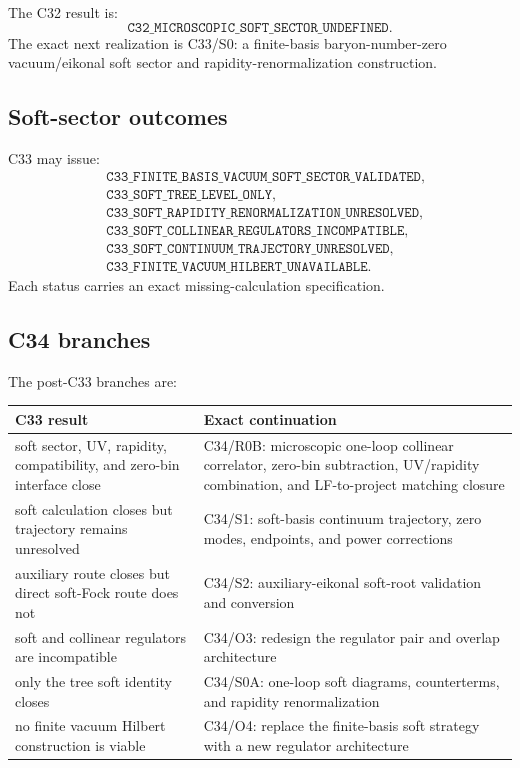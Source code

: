 \documentclass[11pt]{article}
\begin{document}
The C32 result is:
\begin{equation}
 \texttt{C32\_MICROSCOPIC\_SOFT\_SECTOR\_UNDEFINED}.
 \label{eq:current-branch}
\end{equation}
The exact next realization is C33/S0: a finite-basis baryon-number-zero vacuum/eikonal soft sector and rapidity-renormalization construction.

\subsection{Soft-sector outcomes}

C33 may issue:
\begin{align}
 &\texttt{C33\_FINITE\_BASIS\_VACUUM\_SOFT\_SECTOR\_VALIDATED},\\
 &\texttt{C33\_SOFT\_TREE\_LEVEL\_ONLY},\\
 &\texttt{C33\_SOFT\_RAPIDITY\_RENORMALIZATION\_UNRESOLVED},\\
 &\texttt{C33\_SOFT\_COLLINEAR\_REGULATORS\_INCOMPATIBLE},\\
 &\texttt{C33\_SOFT\_CONTINUUM\_TRAJECTORY\_UNRESOLVED},\\
 &\texttt{C33\_FINITE\_VACUUM\_HILBERT\_UNAVAILABLE}.
 \label{eq:c33-statuses}
\end{align}
Each status carries an exact missing-calculation specification.

\subsection{C34 branches}

The post-C33 branches are:
\begin{longtable}{L{0.33\textwidth}L{0.58\textwidth}}
\toprule
C33 result & Exact continuation\\
\midrule
\endhead
soft sector, UV, rapidity, compatibility, and zero-bin interface close &
C34/R0B: microscopic one-loop collinear correlator, zero-bin subtraction, UV/rapidity combination, and LF-to-project matching closure\\
soft calculation closes but trajectory remains unresolved &
C34/S1: soft-basis continuum trajectory, zero modes, endpoints, and power corrections\\
auxiliary route closes but direct soft-Fock route does not &
C34/S2: auxiliary-eikonal soft-root validation and conversion\\
soft and collinear regulators are incompatible &
C34/O3: redesign the regulator pair and overlap architecture\\
only the tree soft identity closes &
C34/S0A: one-loop soft diagrams, counterterms, and rapidity renormalization\\
no finite vacuum Hilbert construction is viable &
C34/O4: replace the finite-basis soft strategy with a new regulator architecture\\
\bottomrule
\end{longtable}
\end{document}
